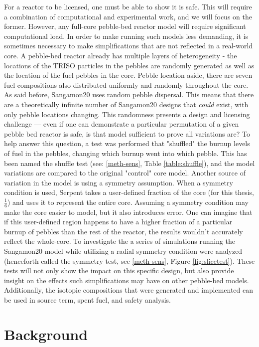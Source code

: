 For a reactor to be licensed, one must be able to show it is safe.  This will require a combination of computational and experimental work, and we will focus on the former. However, any full-core pebble-bed reactor model will require significant computational load.  In order to make running such models less demanding, it is sometimes necessary to make simplifications that are not reflected in a real-world core.  A pebble-bed reactor already has multiple layers of heterogeneity - the locations of the TRISO particles in the pebbles are randomly generated as well as the location of the fuel pebbles in the core.  Pebble location aside, there are seven fuel compositions also distributed uniformly and randomly throughout the core.  As said before, Sangamon20 uses random pebble dispersal.  This means that there are a theoretically infinite number of Sangamon20 designs that \emph{could} exist, with only pebble locations changing.  This randomness presents a design and licensing challenge --- even if one can demonstrate a particular permutation of a given pebble bed reactor is safe, is that model sufficient to prove all variations are?  To help answer this question, a test was performed that "shuffled" the burnup levels of fuel in the pebbles, changing which burnup went into which pebble.  This has been named the shuffle test (see: \autoref{meth-sens}, Table \ref{table:shuffle}), and the model variations are compared to the original "control" core model.  Another source of variation in the model is using a symmetry assumption.  When a symmetry condition is used, Serpent takes a user-defined fraction of the core (for this thesis, $\frac{1}{6}$) and uses it to represent the entire core.  Assuming a symmetry condition may make the core easier to model, but it also introduces error.  One can imagine that if this user-defined region happens to have a higher fraction of a particular burnup of pebbles than the rest of the reactor, the results wouldn't accurately reflect the whole-core.  To investigate the a series of simulations running the Sangamon20 model while utilizing a radial symmetry condition were analyzed (henceforth called the symmetry test, see \autoref{meth-sens}, Figure \ref{fig:slicetest}).  These tests will not only show the impact on this specific design, but also provide insight on the effects such simplifications may have on other pebble-bed models.  Additionally, the isotopic compositions that were generated and implemented can be used in source term, spent fuel, and safety analysis.

\section{Background}
\label{sec:intro-background}

